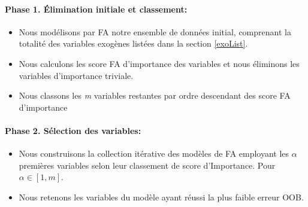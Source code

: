	\paragraph{Phase 1. Élimination initiale et classement:}\begin{itemize}
	\item Nous modélisons par FA notre ensemble de données initial, comprenant la totalité des variables exogènes listées dans la section \ref{exoList}.
	\item Nous calculons les score FA d'importance des variables et nous éliminons les variables d'importance triviale.
	\item Nous classons les \textit{m} variables restantes par ordre descendant des score FA d'importance
	\end{itemize}
	\paragraph{Phase 2. Sélection des variables:}
	\begin{itemize}
	\item Nous construisons la collection itérative des modèles de FA employant les \textit{$\alpha$} premières variables selon leur classement de score d'Importance. Pour ${\alpha \in [1,\textit{m}]}$.
	\item Nous retenons les variables du modèle ayant réussi la plus faible erreur OOB.
	\end{itemize}
	